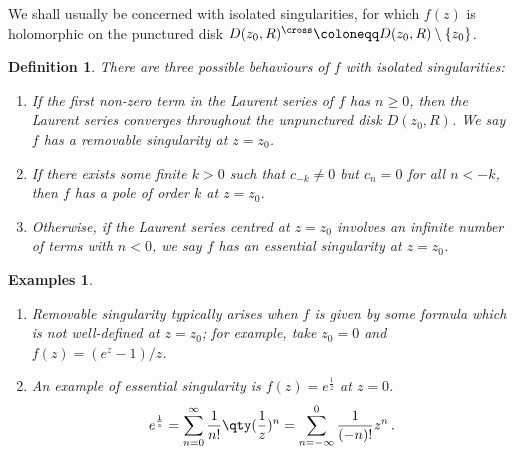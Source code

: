 \documentclass{article}
\theoremstyle{plain}\theoremheaderfont{\normalfont\itshape}\theorembodyfont{\rmfamily}\theoremseparator{.}\newtheorem*{rem}{Remark}\newtheorem*{ex}{Example}\newtheorem*{proof}{Proof}\newtheorem*{altp}{Alternative proof}
\theoremstyle{plain}\theoremheaderfont{\normalfont\bfseries}\theorembodyfont{\rmfamily}\theoremseparator{.}\newtheorem{thm}{Theorem}[section]\newtheorem{lem}[thm]{Lemma}\newtheorem{prop}[thm]{Proposition}\newtheorem*{cor}{Corollary}\newtheorem{defn}[thm]{Definition}\newtheorem{clm}[thm]{Claim}\newtheorem{clminproof}{Claim}
\theoremstyle{break}\theoremheaderfont{\normalfont\itshape}\theorembodyfont{\rmfamily}\theoremseparator{.\medskip}\newtheorem*{proofskip}{Proof}\newtheorem*{exs}{Examples}\newtheorem*{rems}{Remarks}
\theoremstyle{break}\theoremheaderfont{\normalfont\bfseries}\theorembodyfont{\rmfamily}\theoremseparator{.\medskip}\newtheorem{lemskip}[thm]{Lemma}\newtheorem{defnskip}[thm]{Definition}\newtheorem{propskip}[thm]{Proposition}\newtheorem{thmskip}[thm]{Theorem}
\numberwithin{equation}{section}
\begin{document}
	We shall usually be concerned with isolated singularities, for which \(f(z)\) is holomorphic on the punctured disk \(D(z_0,R)^{\cross}\coloneqq D(z_0,R)\setminus\{z_0\}\).
	\begin{defn}
		There are three possible behaviours of \(f\) with isolated singularities:
		\begin{enumerate}[topsep=0pt]
			\item If the first non-zero term in the Laurent series of \(f\) has \(n\ge 0\), then the Laurent series converges throughout the unpunctured disk \(D(z_0,R)\). We say \(f\) has a \textit{removable singularity} at \(z=z_0\).
			\item If there exists some finite \(k>0\) such that \(c_{-k}\ne 0\) but \(c_n=0\) for all \(n<-k\), then \(f\) has a \textit{pole of order \(k\)} at \(z=z_0\).
			\item Otherwise, if the Laurent series centred at \(z=z_0\) involves an infinite number of terms with \(n<0\), we say \(f\) has an \textit{essential singularity} at \(z=z_0\).
		\end{enumerate}
	\end{defn}
	\begin{exs}
		\begin{enumerate}[topsep=0pt]
			\item Removable singularity typically arises when \(f\) is given by some formula which is not well-defined at \(z=z_0\); for example, take \(z_0=0\) and \(f(z)=(e^z-1)/z\).
			\item An example of essential singularity is \(f(z)=e^{\frac{1}{z}}\) at \(z=0\).
			\[e^{\frac{1}{z}}=\sum_{n=0}^{\infty}\frac{1}{n!}\qty(\frac{1}{z})^n=\sum_{n=-\infty}^{0}\frac{1}{(-n)!}z^n\,.\]
		\end{enumerate}
	\end{exs}
\end{document}
